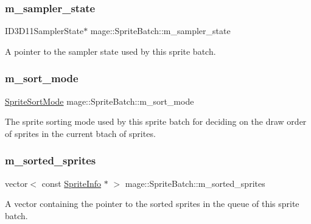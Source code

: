 \subsubsection{\texorpdfstring{m\+\_\+sampler\+\_\+state}{m\_sampler\_state}}
{\footnotesize\ttfamily I\+D3\+D11\+Sampler\+State$\ast$ mage\+::\+Sprite\+Batch\+::m\+\_\+sampler\+\_\+state\hspace{0.3cm}{\ttfamily [private]}}

A pointer to the sampler state used by this sprite batch. \hypertarget{classmage_1_1_sprite_batch_a0b2b16b0d9eb63501b6fc0f9ce85e022}{}\label{classmage_1_1_sprite_batch_a0b2b16b0d9eb63501b6fc0f9ce85e022} 
\subsubsection{\texorpdfstring{m\+\_\+sort\+\_\+mode}{m\_sort\_mode}}
{\footnotesize\ttfamily \hyperlink{namespacemage_a256fa5833eecc408923de7ffadb5e014}{Sprite\+Sort\+Mode} mage\+::\+Sprite\+Batch\+::m\+\_\+sort\+\_\+mode\hspace{0.3cm}{\ttfamily [private]}}

The sprite sorting mode used by this sprite batch for deciding on the draw order of sprites in the current btach of sprites. \hypertarget{classmage_1_1_sprite_batch_a65ad09d31c928ab1522d8b2c0c509b9a}{}\label{classmage_1_1_sprite_batch_a65ad09d31c928ab1522d8b2c0c509b9a} 
\subsubsection{\texorpdfstring{m\+\_\+sorted\+\_\+sprites}{m\_sorted\_sprites}}
{\footnotesize\ttfamily vector$<$ const \hyperlink{structmage_1_1_sprite_info}{Sprite\+Info} $\ast$ $>$ mage\+::\+Sprite\+Batch\+::m\+\_\+sorted\+\_\+sprites\hspace{0.3cm}{\ttfamily [private]}}

A vector containing the pointer to the sorted sprites in the queue of this sprite batch. \hypertarget{classmage_1_1_sprite_batch_a67ab116e403b626771f03f527efa6f2f}{}\label{classmage_1_1_sprite_batch_a67ab116e403b626771f03f527efa6f2f} 
